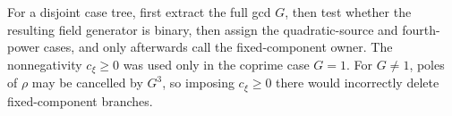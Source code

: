 \begin{remark}
\label{rem:lane4-four-loci-ownership}
For a disjoint case tree, first extract the full gcd \(G\), then test whether
the resulting field generator is binary, then assign the quadratic-source
and fourth-power cases, and only afterwards call the fixed-component owner.
The nonnegativity \(c_\xi\geq0\) was used only in the coprime case \(G=1\).
For \(G\ne1\), poles of \(\rho\) may be cancelled by \(G^3\), so imposing
\(c_\xi\geq0\) there would incorrectly delete fixed-component branches.
\end{remark}
